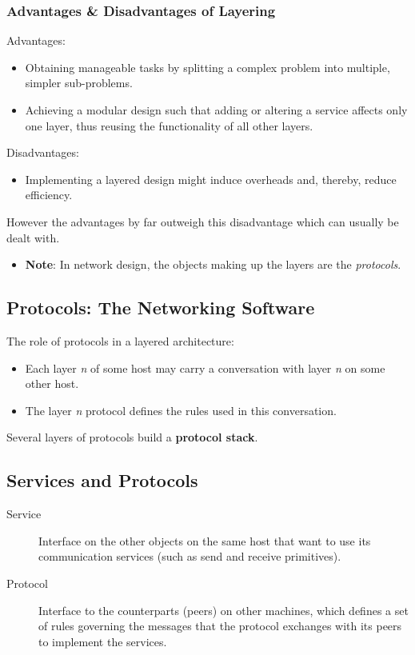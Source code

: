 \documentclass{article}%
\begin{document}
\subsubsection{Advantages \& Disadvantages of Layering}
\label{sec:org049ee96}
Advantages:
\begin{itemize}
\item Obtaining manageable tasks by splitting a complex problem into multiple, simpler sub-problems.
\item Achieving a modular design such that adding or altering a service affects only one layer, thus reusing the functionality of all other layers.
\end{itemize}
Disadvantages:
\begin{itemize}
\item Implementing a layered design might induce overheads and, thereby, reduce efficiency.
\end{itemize}
However the advantages by far outweigh this disadvantage which can usually be dealt with.
\begin{itemize}
\item \textbf{Note}: In network design, the objects making up the layers are the \emph{protocols}.
\end{itemize}

\subsection{Protocols: The Networking Software}
\label{sec:orgcbf23a8}
The role of protocols in a layered architecture:
\begin{itemize}
\item Each layer \emph{n} of some host may carry a conversation with layer \emph{n} on some other host.
\item The layer \emph{n} protocol defines the rules used in this conversation.
\end{itemize}
Several layers of protocols build a \textbf{protocol stack}.

\subsection{Services and Protocols}
\label{sec:org6bf551b}
\begin{description}
\item[{Service}] Interface on the other objects on the same host that want to use its communication services (such as send and receive primitives).
\item[{Protocol}] Interface to the counterparts (peers) on other machines, which defines a set of rules governing the messages that the protocol exchanges with its peers to implement the services.
\end{description}
\end{document}
